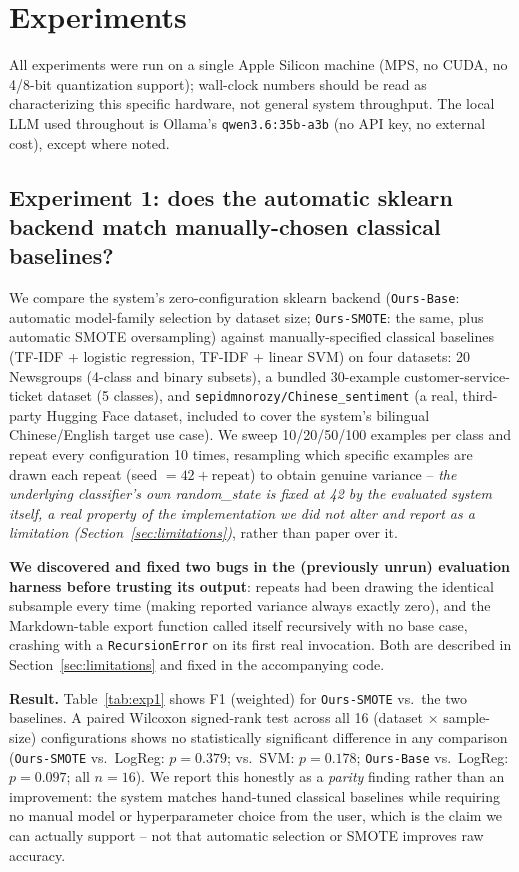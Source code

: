 \documentclass[10pt,twocolumn]{article}
\begin{document}
\section{Experiments}
\label{sec:experiments}

All experiments were run on a single Apple Silicon machine (MPS, no CUDA,
no 4/8-bit quantization support); wall-clock numbers should be read as
characterizing this specific hardware, not general system throughput. The
local LLM used throughout is Ollama's \texttt{qwen3.6:35b-a3b} (no API key,
no external cost), except where noted.

\subsection{Experiment 1: does the automatic sklearn backend match manually-chosen classical baselines?}
\label{sec:exp1}

We compare the system's zero-configuration sklearn backend
(\texttt{Ours-Base}: automatic model-family selection by dataset size;
\texttt{Ours-SMOTE}: the same, plus automatic SMOTE oversampling) against
manually-specified classical baselines (TF-IDF + logistic regression,
TF-IDF + linear SVM) on four datasets: 20 Newsgroups (4-class and binary
subsets), a bundled 30-example customer-service-ticket dataset (5 classes),
and \texttt{sepidmnorozy/Chinese\_sentiment} (a real, third-party Hugging
Face dataset, included to cover the system's bilingual Chinese/English
target use case). We sweep 10/20/50/100 examples per class and repeat every
configuration 10 times, resampling which specific examples are drawn each
repeat (seed $= 42 + \text{repeat}$) to obtain genuine variance --
\emph{the underlying classifier's own random\_state is fixed at 42 by the
evaluated system itself, a real property of the implementation we did not
alter and report as a limitation (Section~\ref{sec:limitations})}, rather
than paper over it.

\textbf{We discovered and fixed two bugs in the (previously unrun)
evaluation harness before trusting its output}: repeats had been drawing the
identical subsample every time (making reported variance always exactly
zero), and the Markdown-table export function called itself recursively
with no base case, crashing with a \texttt{RecursionError} on its first real
invocation. Both are described in Section~\ref{sec:limitations} and fixed in
the accompanying code.

\textbf{Result.} Table~\ref{tab:exp1} shows F1 (weighted) for
\texttt{Ours-SMOTE} vs.\ the two baselines. A paired Wilcoxon signed-rank
test across all 16 (dataset $\times$ sample-size) configurations shows no
statistically significant difference in any comparison
(\texttt{Ours-SMOTE} vs.\ LogReg: $p=0.379$; vs.\ SVM: $p=0.178$;
\texttt{Ours-Base} vs.\ LogReg: $p=0.097$; all $n=16$). We report this
honestly as a \emph{parity} finding rather than an improvement: the system
matches hand-tuned classical baselines while requiring no manual model or
hyperparameter choice from the user, which is the claim we can actually
support -- not that automatic selection or SMOTE improves raw accuracy.
\end{document}
